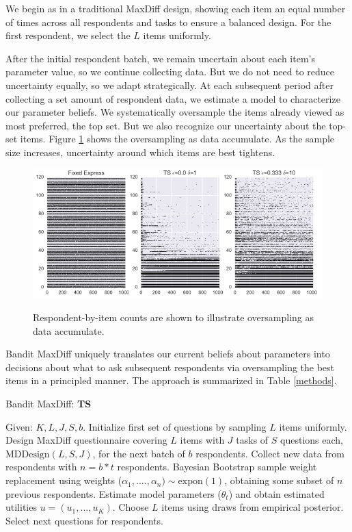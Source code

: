 \documentclass[nonblindrev]{informs3}
\newcommand{\ts}{\textbf{TS} }
\newcommand{\numperset}{L}
\begin{document}
We begin as in a traditional MaxDiff design, showing each item an equal number of times across all respondents and tasks to ensure a balanced design.  For the first respondent, we select the $\numperset$ items uniformly. 

After the initial respondent batch, we remain uncertain about each item's parameter value, so we continue collecting data. But we do not need to reduce uncertainty equally, so we adapt strategically. At each subsequent period after collecting a set amount of respondent data, we estimate a model to characterize our parameter beliefs. We systematically oversample the items already viewed as most preferred, the top set. But we also recognize our uncertainty about the top-set items. Figure \ref{fig:dots} shows the oversampling as data accumulate. As the sample size increases, uncertainty around which items are best tightens.

\begin{figure}[!ht]
\caption{Respondent-by-item counts are shown to illustrate oversampling as data accumulate.}
\includegraphics[width=1\textwidth]{plots/3dotplot-lowres.png}
\label{fig:dots}
\end{figure}

Bandit MaxDiff uniquely translates our current beliefs about parameters into decisions about what to ask subsequent respondents via oversampling the best items in a principled manner. The approach is summarized in Table \ref{methods}.

\begin{algorithm}
\caption{Bandit MaxDiff: \ts} \label{alg:ts_simple}
\begin{algorithmic}[1]
\State Given: $K,\numperset,J,S,b$.
\State Initialize first set of questions by sampling $\numperset$ items uniformly.
\State Design MaxDiff questionnaire covering $\numperset$ items with $J$ tasks of $S$ questions each, $\text{MDDesign}(L,S,J)$, for the next batch of $b$ respondents.
\State Collect new data from respondents with $n = b*t$ respondents.
\State Bayesian Bootstrap sample weight replacement using weights ($\alpha_1, ...., \alpha_n)\sim \text{expon}(1)$, obtaining some subset of $n$ previous respondents.
\State Estimate model parameters ($\theta_t$) and obtain estimated utilities $u = (u_1,...,u_K)$.
\State Choose $\numperset$ items using draws from empirical posterior.
\State Select next questions for respondents.
\end{algorithmic}
\end{algorithm}
\end{document}
